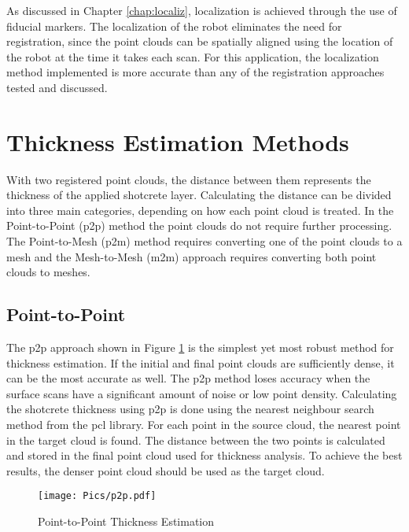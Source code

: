 As discussed in Chapter \ref{chap:localiz}, localization is achieved through the use of fiducial markers. The localization of the robot eliminates the need for registration, since the point clouds can be spatially aligned using the location of the robot at the time it takes each scan. For this application, the localization method implemented is more accurate than any of the registration approaches tested and discussed.\\

\section{Thickness Estimation Methods}

With two registered point clouds, the distance between them represents the thickness of the applied shotcrete layer. Calculating the distance can be divided into three main categories, depending on how each point cloud is treated. In the Point-to-Point (\acrshort{p2p}) method the point clouds do not require further processing. The Point-to-Mesh (\acrshort{p2m}) method requires converting one of the point clouds to a mesh and the Mesh-to-Mesh (\acrshort{m2m}) approach requires converting both point clouds to meshes.\\

\subsection{Point-to-Point}
The \acrshort{p2p} approach shown in Figure \ref{fig:p2pdia} is the simplest yet most robust method for thickness estimation. If the initial and final point clouds are sufficiently dense, it can be the most accurate as well. The \acrshort{p2p} method loses accuracy when the surface scans have a significant amount of noise or low point density. Calculating the shotcrete thickness using \acrshort{p2p} is done using the nearest neighbour search method from the \acrshort{pcl} library. For each point in the source cloud, the nearest point in the target cloud is found. The distance between the two points is calculated and stored in the final point cloud used for thickness analysis. To achieve the best results, the denser point cloud should be used as the target cloud.\\
\label{sec:p2p}
\begin{figure}[h!]
    \centering
    \texttt{[image: Pics/p2p.pdf]}
    \caption{Point-to-Point Thickness Estimation}
    \label{fig:p2pdia}
\end{figure}
